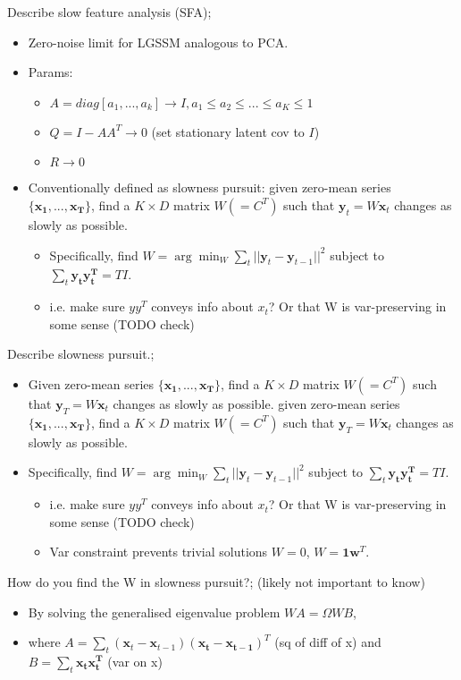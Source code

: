 \documentclass{article}
\begin{document}
Describe slow feature analysis (SFA); \begin{itemize} \item Zero-noise limit for LGSSM analogous to PCA. \item Params: \begin{itemize} \item $A=diag[a_1,...,a_k]\rightarrow I, a_1\leq a_2 \leq ...\leq a_K\leq 1$ \item $Q=I-AA^T\rightarrow 0$ (set stationary latent cov to $I$) \item $R\rightarrow 0$ \end{itemize} \item Conventionally defined as slowness pursuit: given zero-mean series $\{\mathbf{x_1,...,x_T}\}$, find a $K\times D$ matrix $W(=C^T)$ such that $\mathbf{y}_t=W\mathbf{x}_t$ changes as slowly as possible. \begin{itemize} \item Specifically, find $W=\arg\min_W\sum_t||\mathbf{y}_t-\mathbf{y}_{t-1}||^2$ subject to $\sum_t\mathbf{y_ty_t^T}=TI$. \item i.e. make sure $yy^T$ conveys info about $x_t$? Or that W is var-preserving in some sense (TODO check) \end{itemize} \end{itemize}

Describe slowness pursuit.; \begin{itemize} \item Given zero-mean series $\{\mathbf{x_1,...,x_T}\}$, find a $K\times D$ matrix $W(=C^T)$ such that $\mathbf{y}_T=W\mathbf{x}_t$ changes as slowly as possible. given zero-mean series $\{\mathbf{x_1,...,x_T}\}$, find a $K\times D$ matrix $W(=C^T)$ such that $\mathbf{y}_T=W\mathbf{x}_t$ changes as slowly as possible. \item Specifically, find $W=\arg\min_W\sum_t||\mathbf{y}_t-\mathbf{y}_{t-1}||^2$ subject to $\sum_t\mathbf{y_ty_t^T}=TI$. \begin{itemize} \item i.e. make sure $yy^T$ conveys info about $x_t$? Or that W is var-preserving in some sense (TODO check) \item Var constraint prevents trivial solutions $W=0$, $W=\mathbf{1w}^T$. \end{itemize} \end{itemize}

How do you find the W in slowness pursuit?; (likely not important to know) \begin{itemize} \item By solving the generalised eigenvalue problem $WA=\Omega WB$,  \item where $A=\sum_t (\mathbf{x}_t - \mathbf{x}_{t-1})(\mathbf{x_t - x_{t-1}})^T$ (sq of diff of x) and $B=\sum_t\mathbf{x_tx_t^T}$ (var on x) \end{itemize} 
\end{document}
